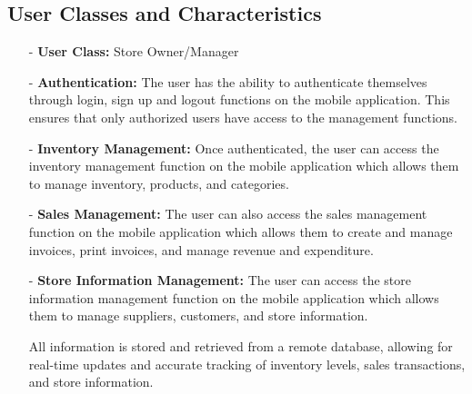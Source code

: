 \documentclass[../thesis.tex]{subfiles}
\begin{document}
\subsection{User Classes and Characteristics}
\begin{itemize}
    \item[-] \textbf{User Class:} Store Owner/Manager
    \item[-] \textbf{Authentication:} The user has the ability to authenticate themselves through login, sign up and logout functions on the mobile application. This ensures that only authorized users have access to the management functions.
    \item[-] \textbf{Inventory Management:} Once authenticated, the user can access the inventory management function on the mobile application which allows them to manage inventory, products, and categories.
    \item[-] \textbf{Sales Management:} The user can also access the sales management function on the mobile application which allows them to create and manage invoices, print invoices, and manage revenue and expenditure.
    \item[-] \textbf{Store Information Management:} The user can access the store information management function on the mobile application which allows them to manage suppliers, customers, and store information.
    \item []All information is stored and retrieved from a remote database, allowing for real-time updates and accurate tracking of inventory levels, sales transactions, and store information.
\end{itemize}
\end{document}

